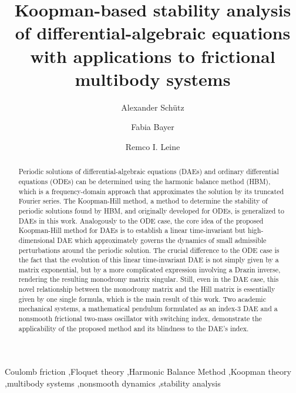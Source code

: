 \documentclass[a4paper, nonatbib, 3p, twocolumn]{elsarticle}
\theoremstyle{plain}
\theoremstyle{definition}
\theoremstyle{remark}
\begin{document}
\begin{frontmatter}
\title{Koopman-based stability analysis of differential-algebraic equations with applications to frictional multibody systems}
\author[unistutt]{Alexander Schütz}
\author[unistutt]{Fabia Bayer}
\author[unistutt]{Remco I. Leine}

\begin{abstract}
    Periodic solutions of differential-algebraic equations (DAEs) and ordinary differential equations (ODEs) can be determined using the harmonic balance method (HBM), which is a frequency-domain approach that approximates the solution by its truncated Fourier series. The Koopman-Hill method, a method to determine the stability of periodic solutions found by HBM, and originally developed for ODEs, is generalized to DAEs in this work. Analogously to the ODE case, the core idea of the proposed Koopman-Hill method for DAEs is to establish a linear time-invariant but high-dimensional DAE which approximately governs the dynamics of small admissible perturbations around the periodic solution. The crucial difference to the ODE case is the fact that the evolution of this linear time-invariant DAE is not simply given by a matrix exponential, but by a more complicated expression involving a Drazin inverse, rendering the resulting monodromy matrix singular. Still, even in the DAE case, this novel relationship between the monodromy matrix and the Hill matrix is essentially given by one single formula, which is the main result of this work. 
    Two academic mechanical systems, a mathematical pendulum formulated as an index-3 DAE and a nonsmooth frictional two-mass oscillator with switching index, demonstrate the applicability of the proposed method and its blindness to the DAE's index.


\end{abstract}

\begin{keyword}
    Coulomb friction \sep Floquet theory \sep Harmonic Balance Method \sep Koopman theory \sep multibody systems \sep nonsmooth dynamics \sep stability analysis
\end{keyword}
\end{frontmatter}
\end{document}
